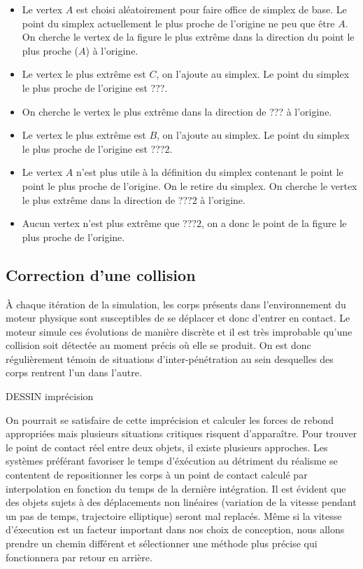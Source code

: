 \begin{itemize}
\item Le vertex $A$ est choisi aléatoirement pour faire office de
  simplex de base. Le point du simplex actuellement le plus proche de
  l'origine ne peu que être $A$. On cherche le vertex de la figure le
  plus extrême dans la direction du point le plus proche ($A$) à
  l'origine.
\item Le vertex le plus extrême est $C$, on l'ajoute au simplex. Le
  point du simplex le plus proche de l'origine est ???.
\item On cherche le vertex le plus extrême dans la direction de ??? à
  l'origine.
\item Le vertex le plus extrême est $B$, on l'ajoute au simplex. Le
  point du simplex le plus proche de l'origine est ???2.
\item Le vertex $A$ n'est plus utile à la définition du simplex
  contenant le point le point le plus proche de l'origine. On le
  retire du simplex. On cherche le vertex le plus extrême dans la
  direction de ???2 à l'origine.
\item Aucun vertex n'est plus extrême que ???2, on a donc le point de
  la figure le plus proche de l'origine.
\end{itemize}

\subsection{Correction d'une collision}

\`A chaque itération de la simulation, les corps présents dans
l'environnement du moteur physique sont susceptibles de se déplacer et
donc d'entrer en contact. Le moteur simule ces évolutions de manière
discrète et il est très improbable qu'une collision soit détectée au
moment précis o\`u elle se produit. On est donc régulièrement témoin
de situations d'inter-pénétration au sein desquelles des corps
rentrent l'un dans l'autre.

DESSIN imprécision

On pourrait se satisfaire de cette imprécision et calculer les forces
de rebond appropriées mais plusieurs situations critiques risquent
d'apparaître. Pour trouver le point de contact réel entre deux objets,
il existe plusieurs approches. Les systèmes préférant favoriser le
temps d'éxécution au détriment du réalisme se contentent de
repositionner les corps à un point de contact calculé par
interpolation en fonction du temps de la dernière intégration. Il est
évident que des objets sujets à des déplacements non linéaires
(variation de la vitesse pendant un pas de temps, trajectoire
elliptique) seront mal replacés. Même si la vitesse d'éxecution est un
facteur important dans nos choix de conception, nous allons prendre un
chemin différent et sélectionner une méthode plus précise qui
fonctionnera par retour en arrière.

